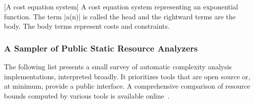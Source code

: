 \begin{center}
\begin{minipage}{\textwidth}
\captionsetup{type=lstlisting}
[A cost equation system]{
A cost equation system representing an exponential function.
The term \pr|a(n)| is called the {head} and the rightward terms are the {body}.
The body terms represent costs and constraints.}
\label{lst:ces}
\end{minipage}
\end{center}

\subsubsection{A Sampler of Public Static Resource Analyzers}
\label{resource-analysis-tools}

The following list presents a small survey of automatic complexity analysis implementations, interpreted broadly.
It prioritizes tools that are open source or, at minimum, provide a public interface.
A comprehensive comparison of resource bounds computed by various tools is available online~\cite{flores_experiments}.

